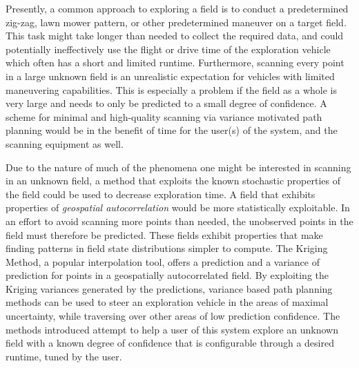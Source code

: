 Presently, a common approach to exploring a field is to conduct a predetermined zig-zag, lawn mower pattern, or other predetermined maneuver on a target field. This task might take longer than needed to collect the required data, and could potentially ineffectively use the flight or drive time of the exploration vehicle which often has a short and limited runtime. Furthermore, scanning every point in a large unknown field is an unrealistic expectation for vehicles with limited maneuvering capabilities. This is especially a problem if the field as a whole is very large and needs to only be predicted to a small degree of confidence. A scheme for minimal and high-quality scanning via variance motivated path planning would be in the benefit of time for the user(s) of the system, and the scanning equipment as well.

Due to the nature of much of the phenomena one might be interested in scanning in an unknown field, a method that exploits the known stochastic properties of the field could be used to decrease exploration time. A field that exhibits properties of \textit{geospatial autocorrelation} would be more statistically exploitable. In an effort to avoid scanning more points than needed, the unobserved points in the field must therefore be predicted. These fields exhibit properties that make finding patterns in field state distributions simpler to compute. The Kriging Method, a popular interpolation tool, offers a prediction and a variance of prediction for points in a geospatially autocorrelated field. By exploiting the Kriging variances generated by the predictions, variance based path planning methods can be used to steer an exploration vehicle in the areas of maximal uncertainty, while traversing over other areas of low prediction confidence. The methods introduced attempt to help a user of this system explore an unknown field with a known degree of confidence that is configurable through a desired runtime, tuned by the user.
